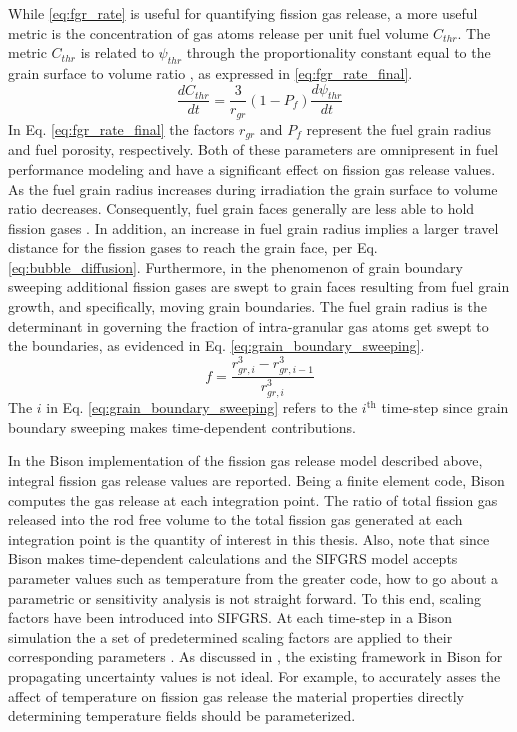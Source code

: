 While \ref{eq:fgr_rate} is useful for quantifying fission gas release, a more useful metric is the concentration of gas atoms release per unit fuel volume $C_{thr}$. The metric $C_{thr}$ is related to $\psi_{thr}$ through the proportionality constant equal to the grain surface to volume ratio \cite{Patore2}, as expressed in \ref{eq:fgr_rate_final}.
\begin{equation}
\label{eq:fgr_rate_final}
 \frac{dC_{thr}}{dt} = \frac{3}{r_{gr}}\left(1 - P_f\right) \frac{d\psi_{thr}}{dt}
\end{equation} 
In Eq. \ref{eq:fgr_rate_final} the factors $r_{gr}$ and $P_f$ represent the fuel grain radius and fuel porosity, respectively. Both of these parameters are omnipresent in fuel performance modeling and have a significant effect on fission gas release values. As the fuel grain radius increases during irradiation the grain surface to volume ratio decreases. Consequently, fuel grain faces generally are less able to hold fission gases \cite{Pastore1}. In addition, an increase in fuel grain radius implies a larger travel distance for the fission gases to reach the grain face, per Eq. \ref{eq:bubble_diffusion}. Furthermore, in the phenomenon of grain boundary sweeping additional fission gases are swept to grain faces resulting from fuel grain growth, and specifically, moving grain boundaries. The fuel grain radius is the determinant in governing the fraction of intra-granular gas atoms get swept to the boundaries, as evidenced in Eq. \ref{eq:grain_boundary_sweeping}.
\begin{equation}
\label{eq:grain_boundary_sweeping}
 f = \frac{r_{gr,i}^3 - r_{gr,i-1}^3}{r_{gr,i}^3}
\end{equation}    
The $i$ in Eq. \ref{eq:grain_boundary_sweeping} refers to the $i^{\mbox{th}}$ time-step since grain boundary sweeping makes time-dependent contributions. 

In the Bison implementation of the fission gas release model described above, integral fission gas release values are reported. Being a finite element code, Bison computes the gas release at each integration point. The ratio of  total fission gas released into the rod free volume to the total fission gas generated at each integration point is the quantity of interest in this thesis. Also, note that since Bison makes time-dependent calculations and the \ac{SIFGRS} model accepts parameter values such as temperature from the greater code, how to go about a parametric or sensitivity analysis is not straight forward. To this end, scaling factors have been introduced into \ac{SIFGRS}. At each time-step in a Bison simulation the a set of predetermined scaling factors are applied to their corresponding parameters \cite{Pastore2}. As discussed in \cite{Pastore2}, the existing framework in Bison for propagating uncertainty values is not ideal. For example, to accurately asses the affect of temperature on fission gas release the material properties directly determining temperature fields should be parameterized.    


